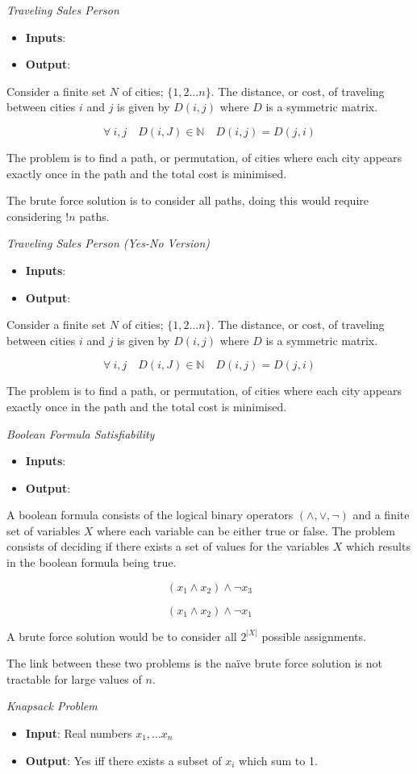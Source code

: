 \textit{Traveling Sales Person}\\
\begin{itemize}
    \item \textbf{Inputs}:
    \item \textbf{Output}:
\end{itemize}
Consider a finite set $N$ of cities; $\{1, 2 \dots n\}$. The distance, or cost,
of traveling between cities $i$ and $j$ is given by $D(i,j)$ where $D$
is a symmetric matrix.

$$\forall\ i, j\quad D(i,J) \in \mathbb{N}\quad D(i,j) = D(j,i)$$

The problem is to find a path, or permutation, of
cities where each city appears exactly once in the path and the total
cost is minimised.

The brute force solution is to consider all paths, doing this would require
considering $!n$ paths.

\textit{Traveling Sales Person (Yes-No Version)}\\
\begin{itemize}
    \item \textbf{Inputs}:
    \item \textbf{Output}:
\end{itemize}
Consider a finite set $N$ of cities; $\{1, 2 \dots n\}$. The distance, or cost,
of traveling between cities $i$ and $j$ is given by $D(i,j)$ where $D$
is a symmetric matrix.

$$\forall\ i, j\quad D(i,J) \in \mathbb{N}\quad D(i,j) = D(j,i)$$

The problem is to find a path, or permutation, of
cities where each city appears exactly once in the path and the total
cost is minimised.

\textit{Boolean Formula Satisfiability}\\
\begin{itemize}
    \item \textbf{Inputs}:
    \item \textbf{Output}:
\end{itemize}
A boolean formula consists of the logical binary operators $(\land, \lor, \neg)$
and a finite set of variables $X$ where each variable can be either true or false.
The problem consists of deciding if there exists a set of values for the variables $X$
which results in the boolean formula being true.

$$(x_1 \land x_2) \land \neg x_3$$

$$(x_1 \land x_2) \land \neg x_1$$

A brute force solution would be to consider all $2^{|X|}$ possible assignments.

The link between these two problems is the na\"ive brute force solution is not
tractable for large values of $n$.

\textit{Knapsack Problem}\\
\begin{itemize}
    \item \textbf{Input}: Real numbers $x_1,\dots x_n$
    \item \textbf{Output}: Yes iff there exists a subset of $x_i$ which sum to 1.
\end{itemize}
